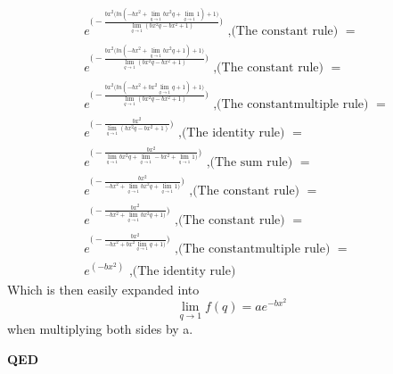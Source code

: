 \begin{align*}
&e^{\Bigg(-\frac{bx^2 \big( ln(-bx^2 + \lim_{q \to 1}bx^2q+ \lim_{q \to 1}1)+ 1 \big)}{\lim_{q \to 1}(bx^2q-bx^2+1)}\Bigg)}\text{ ,(The constant rule) }= \\   
&e^{\Bigg(-\frac{bx^2 \big( ln(-bx^2 + \lim_{q \to 1}bx^2q+1)+ 1 \big)}{\lim_{q \to 1}(bx^2q-bx^2+1)}\Bigg)}\text{ ,(The constant rule) }= \\ 
&e^{\Bigg(-\frac{bx^2 \big( ln(-bx^2 + bx^2\lim_{q \to 1}q+1)+ 1 \big)}{\lim_{q \to 1}(bx^2q-bx^2+1)}\Bigg)}\text{ ,(The constantmultiple rule) }= \\ 
&e^{\Bigg(-\frac{bx^2}{\lim_{q \to 1}(bx^2q-bx^2+1)}\Bigg)}\text{ ,(The identity rule) }= \\ 
&e^{\Bigg(-\frac{bx^2}{\lim_{q \to 1}bx^2q+\lim_{q \to 1}-bx^2+\lim_{q \to 1}1)}\Bigg)}\text{ ,(The sum rule) }= \\ 
&e^{\Bigg(-\frac{bx^2}{-bx^2+\lim_{q \to 1}bx^2q+\lim_{q \to 1}1)}\Bigg)}\text{ ,(The constant rule) }= \\ 
&e^{\Bigg(-\frac{bx^2}{-bx^2+\lim_{q \to 1}bx^2q+1)}\Bigg)}\text{ ,(The constant rule) }= \\  
&e^{\Bigg(-\frac{bx^2}{-bx^2+bx^2\lim_{q \to 1}q+1)}\Bigg)}\text{ ,(The constantmultiple rule) }= \\   
&e^{(-bx^2)}\text{ ,(The identity rule) }
\end{align*}
Which is then easily expanded into
\begin{equation}
\lim_{q \to 1} f(q) = ae^{-bx^2}
\end{equation} 
when multiplying both sides by a. \\
\centerline{\textbf{QED}}